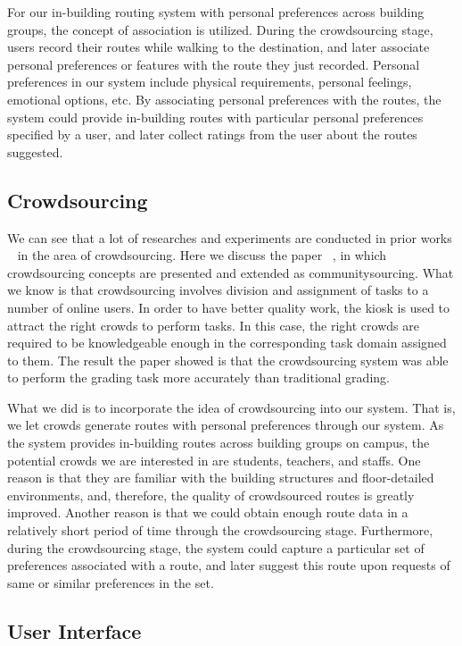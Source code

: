 \documentclass{sigchi}
\begin{document}
For our in-building routing system with personal preferences across building groups, the concept of association is utilized. During the crowdsourcing stage, users record their routes while walking to the destination, and later associate personal preferences or features with the route they just recorded. Personal preferences in our system include physical requirements, personal feelings, emotional options, etc. By associating personal preferences with the routes, the system could provide in-building routes with particular personal preferences specified by a user, and later collect ratings from the user about the routes suggested. 

\subsection{Crowdsourcing}

We can see that a lot of researches and experiments are conducted in prior works ~\cite{heimerl2012communitysourcing,alt2010location} in the area of crowdsourcing. Here we discuss the paper ~\cite{heimerl2012communitysourcing}, in which crowdsourcing concepts are presented and extended as communitysourcing. What we know is that crowdsourcing involves division and assignment of tasks to a number of online users. In order to have better quality work, the kiosk is used to attract the right crowds to perform tasks. In this case, the right crowds are required to be knowledgeable enough in the corresponding task domain assigned to them. The result the paper showed is that the crowdsourcing system was able to perform the grading task more accurately than traditional grading.


What we did is to incorporate the idea of crowdsourcing into our system. That is, we let crowds generate routes with personal preferences through our system. As the system provides in-building routes across building groups on campus, the potential crowds we are interested in are students, teachers, and staffs. One reason is that they are familiar with the building structures and floor-detailed environments, and, therefore, the quality of crowdsourced routes is greatly improved. Another reason is that we could obtain enough route data in a relatively short period of time through the crowdsourcing stage. Furthermore, during the crowdsourcing stage, the system could capture a particular set of preferences associated with a route, and later suggest this route upon requests of same or similar preferences in the set.


\subsection{User Interface}
\end{document}
